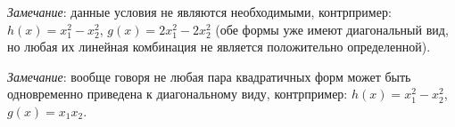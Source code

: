 \textit{Замечание}: данные условия не являются необходимыми, контрпример: $h(x)=x_1^2-x_2^2$, $g(x)=2x_1^2-2x_2^2$ (обе формы уже имеют диагональный вид, но любая их линейная комбинация не является положительно определенной).

\textit{Замечание}: вообще говоря не любая пара квадратичных форм может быть одновременно приведена к диагональному виду, контрпример: $h(x)=x_1^2-x_2^2$, $g(x)=x_1x_2$.

